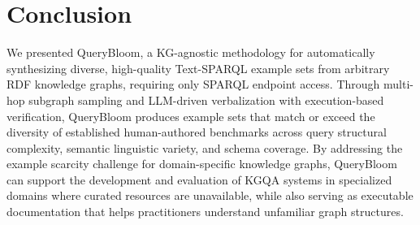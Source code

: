 \section{Conclusion}

We presented QueryBloom, a KG-agnostic methodology for automatically synthesizing diverse, high-quality Text-SPARQL example sets from arbitrary RDF knowledge graphs, requiring only SPARQL endpoint access. Through multi-hop subgraph sampling and LLM-driven verbalization with execution-based verification, QueryBloom produces example sets that match or exceed the diversity of established human-authored benchmarks across query structural complexity, semantic linguistic variety, and schema coverage. By addressing the example scarcity challenge for domain-specific knowledge graphs, QueryBloom can support the development and evaluation of KGQA systems in specialized domains where curated resources are unavailable, while also serving as executable documentation that helps practitioners understand unfamiliar graph structures.